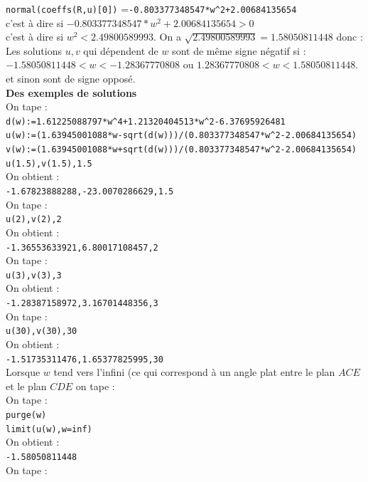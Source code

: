 \documentclass[a4paper,11pt]{book}
\begin{document}
{\tt normal(coeffs(R,u)[0])} ={\tt -0.803377348547*w\verb|^|2+2.00684135654}\\
 c'est \`a dire si $-0.803377348547*w^2+2.00684135654>0$ \\
 c'est \`a dire si $w^2<2.49800589993$.
On a $\sqrt{2.49800589993}=1.58050811448$ donc :\\
Les solutions $u,v$ qui d\'ependent de $w$ sont de m\^eme signe n\'egatif si :\\
$-1.58050811448<w<-1.28367770808$ ou $1.28367770808<w<1.58050811448$.\\
et sinon sont de signe oppos\'e.\\
{\bf Des exemples de solutions}\\
On tape :\\
{\tt d(w):=1.61225088797*w\verb|^|4+1.21320404513*w\verb|^|2-6.37695926481}\\
{\tt u(w):=(1.63945001088*w-sqrt(d(w)))/(0.803377348547*w\verb|^|2-2.00684135654)}\\
{\tt v(w):=(1.63945001088*w+sqrt(d(w)))/(0.803377348547*w\verb|^|2-2.00684135654)}\\
{\tt  u(1.5),v(1.5),1.5}\\
On obtient :\\
{\tt -1.67823888288,-23.0070286629,1.5}\\
On tape :\\
{\tt u(2),v(2),2}\\
On obtient :\\
{\tt -1.36553633921,6.80017108457,2}\\
On tape :\\
{\tt  u(3),v(3),3}\\
On obtient :\\
{\tt -1.28387158972,3.16701448356,3}\\
On tape :\\
{\tt  u(30),v(30),30}\\
On obtient :\\
{\tt -1.51735311476,1.65377825995,30}\\
Lorsque $w$ tend vers l'infini (ce qui correspond \`a un angle plat entre le 
plan $ACE$ et le plan $CDE$ on tape :\\
On tape :\\
{\tt purge(w)}\\
{\tt limit(u(w),w=inf)}\\
On obtient :\\
{\tt -1.58050811448}\\
On tape :\\
\end{document}
